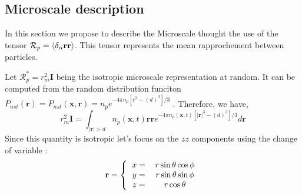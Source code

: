 \subsection{Microscale description}

In this section we propose to describe the Microscale thought the use of the tensor $\mathcal{R}_p  = \left<\delta_\alpha  \textbf{rr}\right>$. 
This tensor represents the mean rapprochement between particles. 
\begin{figure}[h!]
    \centering
      \hfill
  \end{figure}
Let $\mathcal{R}_p^* = r_m^2 \textbf{I}$ being the isotropic microscale representation at random. 
It can be computed from the random distribution funciton $P_{nst}(\textbf{r}) =     P_{nst}(\textbf{x},\textbf{r})
= n_p e^{-4\pi n_p [r^3- (d)^3]/3}$ \citep{zhang2021ensemble}. 
Therefore, we have, 
\begin{equation}
    r_m^2 \textbf{I}
    = \int_{|\textbf{r}| > d}
    n_p(\textbf{x},t) \textbf{rr} e^{-4\pi n_p(\textbf{x},t) [|\textbf{r}|^3- (d)^3]/3}
    d\textbf{r}
\end{equation}
Since this quantity is isotropic let's focus on the $zz$ components using the change of variable : 
\begin{equation*}
    \textbf{r} = 
    \left\{
        \begin{tabular}{cc}
            $x =$&$ r \sin\theta \cos\phi$\\
            $y =$&$ r \sin\theta \sin\phi$\\
            $z =$&$ r \cos\theta$
        \end{tabular}
    \right.
\end{equation*}
